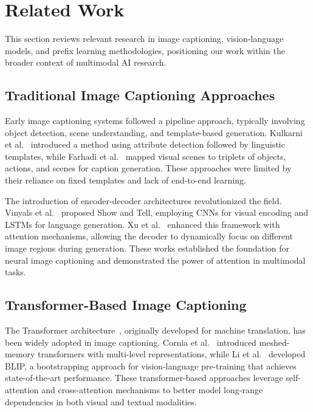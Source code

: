 \documentclass[runningheads]{llncs}
\begin{document}
\section{Related Work}

This section reviews relevant research in image captioning, vision-language models, and prefix learning methodologies, positioning our work within the broader context of multimodal AI research.

\subsection{Traditional Image Captioning Approaches}

Early image captioning systems followed a pipeline approach, typically involving object detection, scene understanding, and template-based generation. Kulkarni et al.~\cite{kulkarni2011baby} introduced a method using attribute detection followed by linguistic templates, while Farhadi et al.~\cite{farhadi2010every} mapped visual scenes to triplets of objects, actions, and scenes for caption generation. These approaches were limited by their reliance on fixed templates and lack of end-to-end learning.

The introduction of encoder-decoder architectures revolutionized the field. Vinyals et al.~\cite{vinyals2015show} proposed Show and Tell, employing CNNs for visual encoding and LSTMs for language generation. Xu et al.~\cite{xu2015show} enhanced this framework with attention mechanisms, allowing the decoder to dynamically focus on different image regions during generation. These works established the foundation for neural image captioning and demonstrated the power of attention in multimodal tasks.

\subsection{Transformer-Based Image Captioning}

The Transformer architecture~\cite{vaswani2017attention}, originally developed for machine translation, has been widely adopted in image captioning. Cornia et al.~\cite{cornia2020meshed} introduced meshed-memory transformers with multi-level representations, while Li et al.~\cite{li2022blip} developed BLIP, a bootstrapping approach for vision-language pre-training that achieves state-of-the-art performance. These transformer-based approaches leverage self-attention and cross-attention mechanisms to better model long-range dependencies in both visual and textual modalities.
\end{document}

